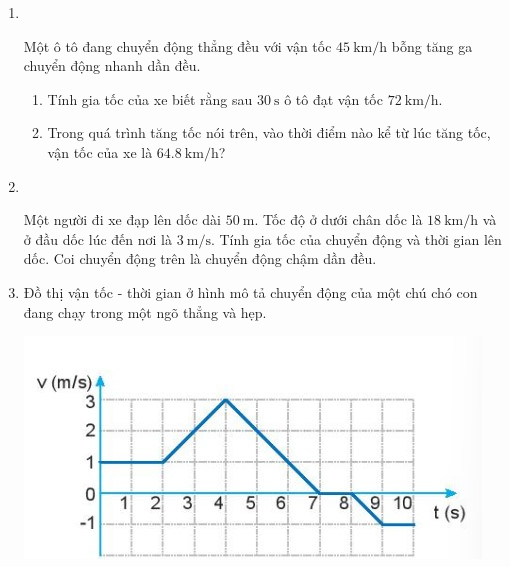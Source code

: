 \begin{enumerate}[label=\bfseries Bài \arabic*:]
	\item {}\\
{Một ô tô đang chuyển động thẳng đều với vận tốc $\SI{45}{\kilo\meter/\hour}$ bỗng tăng ga chuyển động nhanh dần đều.
	\begin{enumerate}[label=\alph*.]
		\item Tính gia tốc của xe biết rằng sau $\SI{30}{\second}$ ô tô đạt vận tốc $\SI{72}{\kilo\meter/\hour}$.
		\item Trong quá trình tăng tốc nói trên, vào thời điểm nào kể từ lúc tăng tốc, vận tốc của xe là $\SI{64.8}{\kilo\meter/\hour}$?
	\end{enumerate}
}



	\item {}\\
	{Một người đi xe đạp lên dốc dài $\SI{50}{\meter}$. Tốc độ ở dưới chân dốc là $\SI{18}{\kilo\meter/\hour}$ và ở đầu dốc lúc đến nơi là $\SI{3}{\meter/\second}$. Tính gia tốc của chuyển động và thời gian lên dốc. Coi chuyển động trên là chuyển động chậm dần đều.
	
}
	\item {}
	
	
	{Đồ thị vận tốc - thời gian ở hình mô tả chuyển động của một chú chó con đang chạy trong một ngõ thẳng và hẹp.
		\begin{center}
			\includegraphics[scale=1]{../figs/VN10-2022-PH-TP012-5.jpg}
		\end{center}
		
}
\end{enumerate}
